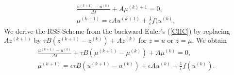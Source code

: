 \documentclass[11pt]{article}
\newcommand{\Frac}[2] {\frac{\textstyle #1} {\textstyle #2}}
\begin{document}
\begin{eqnarray*}\label{CHC}
\Frac{u^{(k+1)}-u^{(k)}}{\Delta t} +A\mu^{(k)+1}=0,\\
\mu^{(k+1)}=\epsilon Au^{(k+1)}+\Frac{1}{\epsilon}f(u^{(k)},
\end{eqnarray*}
We derive the RSS-Scheme from the backward Euler's (\ref{CHC}) by
replacing $Az^{(k+1)}$ by $\tau B(z^{(k+1)}-z^{(k)})+Az^{(k)}$ for $z=u$ or $z=\mu$. We obtain
\begin{eqnarray*}
\Frac{u^{(k+1)}-u^{(k)}}{\Delta t}+\tau B(\mu^{(k+1)}-\mu^{(k)}) +A\mu^{(k)}=0,\\
\mu^{(k+1)}=\epsilon \tau B (u^{(k+1)}-u^{(k)})+\epsilon Au^{(k)}+\Frac{1}{\epsilon} f(u^{(k)}).
\end{eqnarray*}
\end{document}
